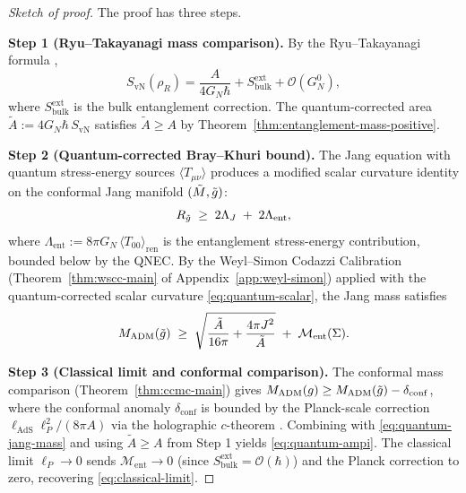 \begin{proof}[Sketch of proof]
The proof has three steps.

\textbf{Step 1 (Ryu--Takayanagi mass comparison).} By the Ryu--Takayanagi formula \cite{ryu2006, ryutakayanagi2006},
\begin{equation}\label{eq:rt-formula}
S_{\mathrm{vN}}(\rho_R) = \dfrac{A}{4G_N\hbar} + S_{\mathrm{bulk}}^{\mathrm{ext}} + \mathcal{O}(G_N^0),
\end{equation}
where $S_{\mathrm{bulk}}^{\mathrm{ext}}$ is the bulk entanglement correction. The quantum-corrected area $\tilde A := 4G_N\hbar\,S_{\mathrm{vN}}$ satisfies $\tilde A \geq A$ by Theorem~\ref{thm:entanglement-mass-positive}.

\textbf{Step 2 (Quantum-corrected Bray--Khuri bound).} The Jang equation with quantum stress-energy sources $\langle T_{\mu\nu}\rangle$ produces a modified scalar curvature identity on the conformal Jang manifold $(\tilde{M}, \tilde{g})$:
\begin{equation}\label{eq:quantum-scalar}
R_{\tilde{g}} \;\geq\; 2\Lambda_J \;+\; 2\Lambda_{\mathrm{ent}},
\end{equation}
where $\Lambda_{\mathrm{ent}} := 8\pi G_N\,\langle T_{00}\rangle_{\mathrm{ren}}$ is the entanglement stress-energy contribution, bounded below by the QNEC. By the Weyl--Simon Codazzi Calibration (Theorem~\ref{thm:wscc-main} of Appendix~\ref{app:weyl-simon}) applied with the quantum-corrected scalar curvature \eqref{eq:quantum-scalar}, the Jang mass satisfies
\begin{equation}\label{eq:quantum-jang-mass}
M_{\mathrm{ADM}}(\tilde{g}) \;\geq\; \sqrt{\dfrac{\tilde A}{16\pi} + \dfrac{4\pi J^2}{\tilde A}} \;+\; \mathcal{M}_{\mathrm{ent}}(\Sigma).
\end{equation}

\textbf{Step 3 (Classical limit and conformal comparison).} The conformal mass comparison (Theorem~\ref{thm:ccmc-main}) gives $M_{\mathrm{ADM}}(g) \geq M_{\mathrm{ADM}}(\tilde{g}) - \delta_{\mathrm{conf}}$, where the conformal anomaly $\delta_{\mathrm{conf}}$ is bounded by the Planck-scale correction $\ell_{\mathrm{AdS}}\ell_P^2/(8\pi A)$ via the holographic $c$-theorem \cite{friedan1986, osborn1991}. Combining with \eqref{eq:quantum-jang-mass} and using $\tilde A \geq A$ from Step 1 yields \eqref{eq:quantum-ampi}. The classical limit $\ell_P \to 0$ sends $\mathcal{M}_{\mathrm{ent}} \to 0$ (since $S_{\mathrm{bulk}}^{\mathrm{ext}} = \mathcal{O}(\hbar)$) and the Planck correction to zero, recovering \eqref{eq:classical-limit}.
\end{proof}

